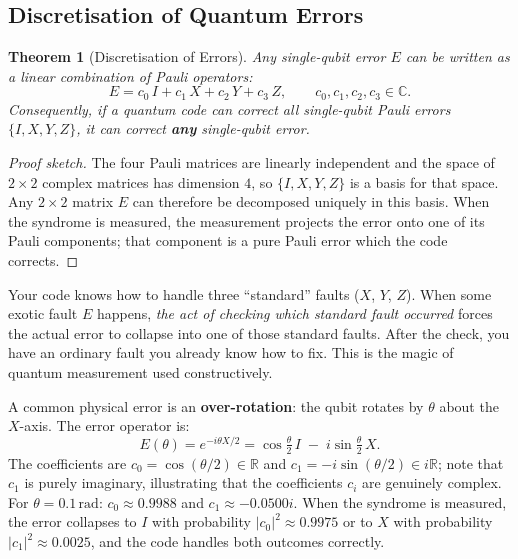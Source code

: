 \documentclass[11pt, a4paper]{article}
\theoremstyle{definition}
\theoremstyle{plain}
\newtheorem{theorem}{Theorem}[section]
\theoremstyle{remark}
\begin{document}
\subsection{Discretisation of Quantum Errors}
\label{sec:discretisation}

\begin{theorem}[Discretisation of Errors]
\label{thm:discretisation}
Any single-qubit error $E$ can be written as a linear combination of Pauli
operators:
\[
  E = c_0\, I + c_1\, X + c_2\, Y + c_3\, Z, \qquad c_0,c_1,c_2,c_3 \in \mathbb{C}.
\]
Consequently, if a quantum code can correct all single-qubit Pauli errors
$\{I, X, Y, Z\}$, it can correct \textbf{any} single-qubit error.
\end{theorem}

\begin{proof}[Proof sketch]
The four Pauli matrices are linearly independent and the space of $2\times2$
complex matrices has dimension $4$, so $\{I,X,Y,Z\}$ is a basis for that
space.  Any $2\times2$ matrix $E$ can therefore be decomposed uniquely in
this basis.  When the syndrome is measured, the measurement projects the
error onto one of its Pauli components; that component is a pure Pauli
error which the code corrects.
\end{proof}

\begin{intuition}
Your code knows how to handle three ``standard'' faults ($X$, $Y$, $Z$).
When some exotic fault $E$ happens, \emph{the act of checking which standard
fault occurred} forces the actual error to collapse into one of those
standard faults.  After the check, you have an ordinary fault you already
know how to fix.  This is the magic of quantum measurement used
constructively.
\end{intuition}

\begin{workedexample}
A common physical error is an \textbf{over-rotation}: the qubit rotates by
$\theta$ about the $X$-axis.  The error operator is:
\[
  E(\theta) = e^{-i\theta X/2}
            = \cos\!\tfrac{\theta}{2}\, I \;-\; i\sin\!\tfrac{\theta}{2}\, X.
\]
The coefficients are $c_0 = \cos(\theta/2) \in \mathbb{R}$ and
$c_1 = -i\sin(\theta/2) \in i\mathbb{R}$; note that $c_1$ is purely
imaginary, illustrating that the coefficients $c_i$ are genuinely complex.
For $\theta = 0.1\,\mathrm{rad}$: $c_0 \approx 0.9988$ and
$c_1 \approx -0.0500i$.  When the syndrome is measured, the error collapses
to $I$ with probability $|c_0|^2 \approx 0.9975$ or to $X$ with probability
$|c_1|^2 \approx 0.0025$, and the code handles both outcomes correctly.
\end{workedexample}
\end{document}
